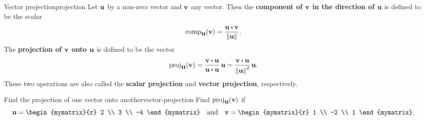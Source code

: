 \begin{definition}{Vector projection}{projection}
  Let $\mbox{\bf u}$ by a non-zero vector and $\mbox{\bf v}$ any vector. Then
  the \textbf{component of $\mbox{\bf v}$ in the direction of
    $\mbox{\bf u}$} is defined to be the scalar
  \begin{equation*}
    \comp_{\vect{u}}(\vect{v})
    = \frac{\vect{u}\dotprod \vect{v}}{\norm{\vect{u}}}.
  \end{equation*}
  The \textbf{projection of $\mbox{\bf v}$ onto
    $\mbox{\bf u}$} is defined to be the vector
  \begin{equation*}
    \proj_{\vect{u}}(\vect{v}) =
      \frac{\vect{v}\dotprod \vect{u}}{\vect{u}\dotprod \vect{u}}\, \vect{u}
    =
    \frac{\vect{v}\dotprod \vect{u}}{\norm{\vect{u}} ^{2}}\,\vect{u}.
  \end{equation*}
  These two operations are also called the \textbf{scalar
    projection}
  and \textbf{vector projection}, respectively.
\end{definition}

\begin{example}{Find the projection of one vector onto another}{vector-projection}
  Find $\proj_{\vect{u}}(\vect{v})$ if
  \begin{equation*}
    \vect{u}=
    \begin{mymatrix}{r}
      2 \\
      3 \\
      -4
    \end{mymatrix}
    \quad\mbox{and}\quad
    \vect{v}=
    \begin{mymatrix}{r}
      1 \\
      -2 \\
      1
    \end{mymatrix}.
  \end{equation*}
\end{example}

